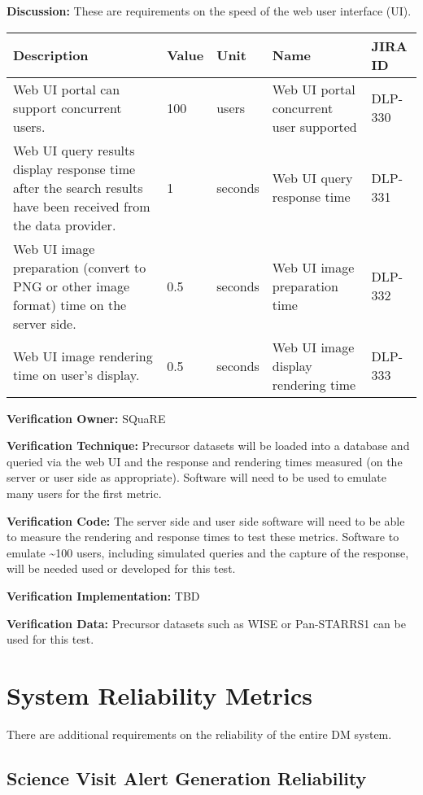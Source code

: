 \textbf{Discussion:} These are requirements on the speed of the web user
interface (UI).

\begin{longtable}[]{@{}lllll@{}}
\toprule
Description & Value & Unit & Name & JIRA ID\tabularnewline
\midrule
\endhead
Web UI portal can support concurrent users. & 100 & users & Web UI
portal concurrent user supported & DLP-330\tabularnewline
Web UI query results display response time after the search results have
been received from the data provider. & 1 & seconds & Web UI query
response time & DLP-331\tabularnewline
Web UI image preparation (convert to PNG or other image format) time on
the server side. & 0.5 & seconds & Web UI image preparation time &
DLP-332\tabularnewline
Web UI image rendering time on user's display. & 0.5 & seconds & Web UI
image display rendering time & DLP-333\tabularnewline
\bottomrule
\end{longtable}

\textbf{Verification Owner:} SQuaRE

\textbf{Verification Technique:} Precursor datasets will be loaded into
a database and queried via the web UI and the response and rendering
times measured (on the server or user side as appropriate). Software
will need to be used to emulate many users for the first metric.

\textbf{Verification Code:} The server side and user side software will
need to be able to measure the rendering and response times to test
these metrics. Software to emulate \textasciitilde{}100 users, including
simulated queries and the capture of the response, will be needed used
or developed for this test.

\textbf{Verification Implementation:} TBD

\textbf{Verification Data:} Precursor datasets such as WISE or
Pan-STARRS1 can be used for this test.

\section{System Reliability Metrics}\label{system-reliability-metrics}

There are additional requirements on the reliability of the entire DM
system.

\subsection{Science Visit Alert Generation
Reliability}\label{science-visit-alert-generation-reliability}

